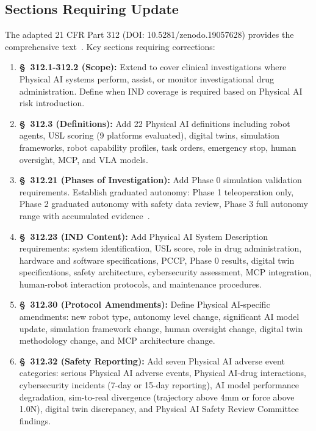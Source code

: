 \subsection{Sections Requiring Update}

The adapted 21 CFR Part 312 (DOI: 10.5281/zenodo.19057628) provides the
comprehensive text~\cite{cfr312adapt}. Key sections requiring corrections:

\begin{enumerate}[label=(\alph*)]
\item \textbf{\S~312.1-312.2 (Scope):} Extend to cover clinical investigations
  where Physical AI systems perform, assist, or monitor investigational drug
  administration. Define when IND coverage is required based on Physical AI
  risk introduction.

\item \textbf{\S~312.3 (Definitions):} Add 22 Physical AI definitions
  including robot agents, USL scoring (9 platforms evaluated), digital twins,
  simulation frameworks, robot capability profiles, task orders, emergency
  stop, human oversight, MCP, and VLA models.

\item \textbf{\S~312.21 (Phases of Investigation):} Add Phase 0 simulation
  validation requirements. Establish graduated autonomy: Phase 1 teleoperation
  only, Phase 2 graduated autonomy with safety data review, Phase 3 full
  autonomy range with accumulated evidence~\cite{cfr312adapt}.

\item \textbf{\S~312.23 (IND Content):} Add Physical AI System Description
  requirements: system identification, USL score, role in drug administration,
  hardware and software specifications, PCCP, Phase 0 results, digital twin
  specifications, safety architecture, cybersecurity assessment, MCP
  integration, human-robot interaction protocols, and maintenance procedures.

\item \textbf{\S~312.30 (Protocol Amendments):} Define Physical AI-specific
  amendments: new robot type, autonomy level change, significant AI model
  update, simulation framework change, human oversight change, digital twin
  methodology change, and MCP architecture change.

\item \textbf{\S~312.32 (Safety Reporting):} Add seven Physical AI adverse
  event categories: serious Physical AI adverse events, Physical AI-drug
  interactions, cybersecurity incidents (7-day or 15-day reporting), AI model
  performance degradation, sim-to-real divergence (trajectory above 4mm or
  force above 1.0N), digital twin discrepancy, and Physical AI Safety Review
  Committee findings.


\end{enumerate}
